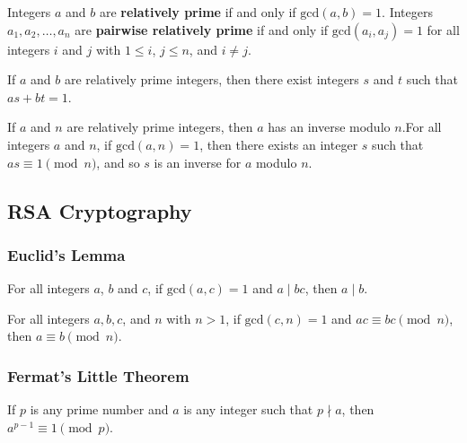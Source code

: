 \begin{definition}
    Integers $a$ and $b$ are \textbf{relatively prime} if and only if $\text{gcd}(a,b)=1$. Integers $a_1,a_2,\ldots,a_n$ are \textbf{pairwise relatively prime} if and only if $\text{gcd}(a_i,a_j)=1$ for all integers $i$ and $j$ with $1 \leq i$, $j\leq n$, and $i\neq j$.
\end{definition}

\begin{corollary}
    If $a$ and $b$ are relatively prime integers, then there exist integers $s$ and $t$ such that $as+bt=1$.
\end{corollary}

\begin{corollary}
    If $a$ and $n$ are relatively prime integers, then $a$ has an inverse modulo $n$.For all integers $a$ and $n$, if $\text{gcd}(a,n)=1$, then there exists an integer $s$ such that $as\equiv 1 \pmod n$, and so $s$ is an inverse for $a$ modulo $n$.   
\end{corollary}

\subsection*{RSA Cryptography}

\subsubsection*{Euclid's Lemma}

\begin{theorem}
    For all integers $a$, $b$ and $c$, if $\text{gcd}(a,c)=1$ and $a\mid bc$, then $a\mid b$.
\end{theorem}

\begin{theorem}
    For all integers $a,b,c$, and $n$ with $n>1$, if $\text{gcd}(c,n)=1$ and $ac \equiv bc \pmod n$, then $a \equiv b \pmod n$.
\end{theorem}

\subsubsection*{Fermat's Little Theorem}

\begin{theorem}
    If $p$ is any prime number and $a$ is any integer such that $p \nmid a$, then $a^{p-1} \equiv 1 \pmod p$.
\end{theorem}

